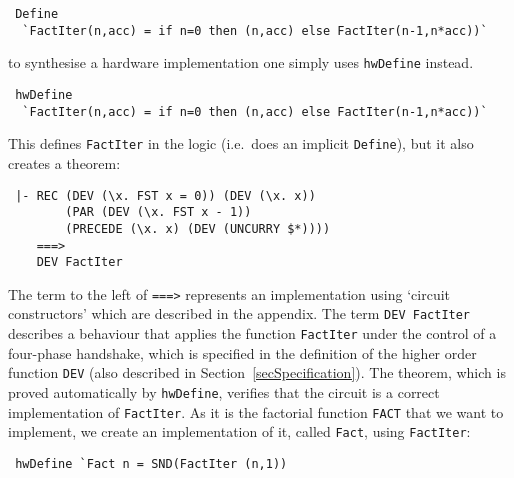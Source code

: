 {\baselineskip10pt\begin{verbatim}
 Define 
  `FactIter(n,acc) = if n=0 then (n,acc) else FactIter(n-1,n*acc))`
\end{verbatim}}

\vspace*{-2mm}

\noindent to synthesise a hardware implementation one simply uses
\texttt{hwDefine} instead.

\vspace*{-2mm}

{\baselineskip10pt\begin{verbatim}
 hwDefine 
  `FactIter(n,acc) = if n=0 then (n,acc) else FactIter(n-1,n*acc))`
\end{verbatim}}

\vspace*{-2mm}

\noindent This defines \texttt{FactIter} in the logic (i.e.~does an
implicit \texttt{Define}), but it also creates a theorem:

\vspace*{-2mm}

{\baselineskip10pt\begin{verbatim}
 |- REC (DEV (\x. FST x = 0)) (DEV (\x. x))
        (PAR (DEV (\x. FST x - 1))
        (PRECEDE (\x. x) (DEV (UNCURRY $*)))) 
    ===> 
    DEV FactIter
\end{verbatim}}

\vspace*{-2mm}

\noindent The term to the left of \texttt{===>}
represents an implementation using `circuit constructors' which are
described in the appendix.  The term \texttt{DEV~FactIter} describes a
behaviour that applies the function \texttt{FactIter} under the
control of a four-phase handshake, which is specified in the
definition of the higher order function \texttt{DEV} (also described
in Section~\ref{secSpecification}). The theorem, which is proved
automatically by \texttt{hwDefine}, verifies that the circuit is a
correct implementation of \texttt{FactIter}. As it is the factorial
function \texttt{FACT} that we want to implement, we create an
implementation of it, called \texttt{Fact}, using \texttt{FactIter}:

\vspace*{-2mm}

{\baselineskip10pt\begin{verbatim}
 hwDefine `Fact n = SND(FactIter (n,1))
\end{verbatim}}

